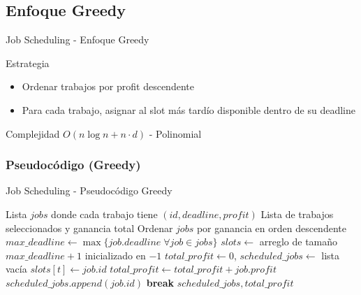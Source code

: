 \documentclass[aspectratio=169]{beamer}
\renewcommand{\algorithmicrequire}{\textbf{Entrada:}}
\renewcommand{\algorithmicensure}{\textbf{Salida:}}
\newcommand{\REQUIRE}{\State[\algorithmicrequire]}
\newcommand{\ENSURE}{\State[\algorithmicensure]}
\begin{document}
\subsection{Enfoque Greedy}
\begin{frame}{Job Scheduling - Enfoque Greedy}
\begin{block}{Estrategia}
\begin{itemize}
\item Ordenar trabajos por profit descendente
\item Para cada trabajo, asignar al slot más tardío disponible dentro de su deadline
\end{itemize}
\end{block}

\begin{alertblock}{Complejidad}
$O(n \log n + n \cdot d)$ - Polinomial
\end{alertblock}
\end{frame}

\subsubsection{Pseudocódigo (Greedy)}
\begin{frame}[fragile]{Job Scheduling - Pseudocódigo Greedy}
\scriptsize
\begin{algorithmic}[1]
\REQUIRE Lista $jobs$ donde cada trabajo tiene $(id, deadline, profit)$
\ENSURE Lista de trabajos seleccionados y ganancia total
\State Ordenar $jobs$ por ganancia en orden descendente 
\State $max\_deadline \leftarrow \max\{job.deadline \;\forall job\in jobs\}$
\State $slots \leftarrow$ arreglo de tamaño $max\_deadline + 1$ inicializado en $-1$ 
\State $total\_profit \leftarrow 0$, $scheduled\_jobs \leftarrow$ lista vacía
     
            \State $slots[t] \leftarrow job.id$
            \State $total\_profit \leftarrow total\_profit + job.profit$
            \State $scheduled\_jobs.append(job.id)$
            \State \textbf{break}
        \EndIf
    \EndFor
\EndFor
\Return $scheduled\_jobs, total\_profit$
\end{algorithmic}
\normalsize
\end{frame}
\end{document}
